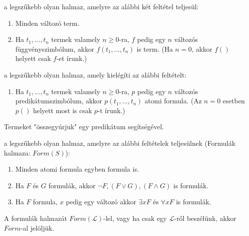 \begin{frame}
\begin{tcolorbox}[title={Az $\mathcal{L}$ elsőrendű nyelv formulái}]
\underline{} a legszűkebb olyan halmaz, amelyre az alábbi két feltétel teljesül:\\
\begin{enumerate}
\item Minden változó term.
\item Ha $t_1, ..., t_n$ termek valamely $n \geq 0$-ra, $f$ pedig egy $n$ változós függvényszimbólum,
akkor $f(t_1, ..., t_n)$ is term. (Ha $n = 0$, akkor $f()$ helyett csak $f$-et írunk.)
\end{enumerate}
\mmedskip

\underline{} a legszűkebb olyan halmaz, amely kielégíti az alábbi feltételt:\\
\begin{enumerate}
\item Ha $t_1, ..., t_n$ termek valamely $n \geq 0$-ra, $p$ pedig egy $n$ változós predikátumszimbólum, akkor $p(t_1, ..., t_n)$ atomi formula. (Az $n = 0$ esetben $p()$ helyett most is csak $p$-t írunk.)
\end{enumerate}
{\small Termeket "összegyúrjuk" egy predikátum segítségével.}\\
\mmedskip

\underline{} a legszűkebb olyan halmaz, amelyre az alábbi feltételek teljesülnek (Formulák halmaza: $Form(S)$):\\
\begin{enumerate}
\item Minden atomi formula egyben formula is.
\item Ha $F$ és $G$ formulák, akkor ${\neg}F, (F \lor G), (F \land G)$ is formulák.
\item Ha $F$ formula, $x$ pedig egy változó akkor ${\exists}xF$ és ${\forall}xF$ is formulák.
\end{enumerate}
\mmedskip

A formulák halmazát $Form(\mathcal{L})$-lel, vagy ha csak egy $\mathcal{L}$-ről beszélünk, akkor $Form$-al jelöljük.
\end{tcolorbox}

\end{frame}

